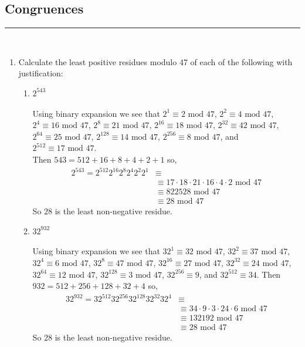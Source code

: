 \documentclass[class=article, crop=false]{standalone}
\begin{document}
\subsection{Congruences}
\hfill {}
\rule{\textwidth}{1pt}\\
\begin{enumerate}
\item
  Calculate the least positive residues modulo 47 of each of
  the following with justification:
  \begin{enumerate}
  \item $2^{543}$ \\\\
  Using binary expansion we see that $2^1 \equiv 2\mbox{ mod } 47$, $2^2 \equiv 4\mbox{ mod } 47$,
  $2^4 \equiv 16\mbox{ mod } 47$, $2^8 \equiv 21\mbox{ mod } 47$, $2^{16} \equiv 18\mbox{ mod } 47$, $2^{32} \equiv 42\mbox{ mod } 47$,
  $2^{64}\equiv 25\mbox{ mod } 47$, $2^{128}\equiv 14\mbox{ mod } 47$, $2^{256}\equiv 8\mbox{ mod } 47$, and $2^{512}\equiv 17\mbox{ mod } 47$.\\
  Then $543 = 512 + 16 + 8 + 4 + 2 + 1$ so,
  \begin{align*}
	2^{543} = 2^{512}2^{16}2^{8}2^{4}2^{2}2^{1} &\equiv \\
	&\equiv 17\cdot18\cdot 21\cdot 16\cdot 4\cdot 2 \mbox{ mod } 47 \\
	&\equiv 822528 \mbox{ mod } 47 \\
	&\equiv 28 \mbox{ mod } 47
  \end{align*}
  So $28$ is the least non-negative residue.
  
  \item $32^{932}$ \\\\
  Using binary expansion we see that $32^1 \equiv 32\mbox{ mod }47$,
  $32^2 \equiv 37\mbox{ mod }47$, $32^4\equiv 6\mbox{ mod }47$, $32^8\equiv 47\mbox{ mod }47$,
  $32^{16}\equiv 27\mbox{ mod }47$, $32^{32}\equiv 24\mbox{ mod }47$, $32^{64}\equiv 12\mbox{ mod }47$,
  $32^{128}\equiv 3\mbox{ mod }47$, $32^{256}\equiv 9$, and $32^{512}\equiv 34$.
  Then $932 = 512 + 256 + 128 + 32 + 4$ so,
  \begin{align*}
	32^{932} = 32^{512}32^{256}32^{128}32^{32}32^4 &\equiv \\
	&\equiv 34\cdot 9\cdot 3\cdot 24\cdot 6 \mbox{ mod }47 \\
	&\equiv 132192 \mbox{ mod }47 \\
	&\equiv 28 \mbox{ mod }47
  \end{align*}
  So $28$ is the least non-negative residue.
  

\end{enumerate}
\end{enumerate}
\end{document}
